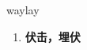 
\begin{frame}
{\huge waylay}
\begin{center}
\begin{enumerate}\Large
  \item \textbf{伏击，埋伏}
\end{enumerate}
\end{center}
\end{frame}
